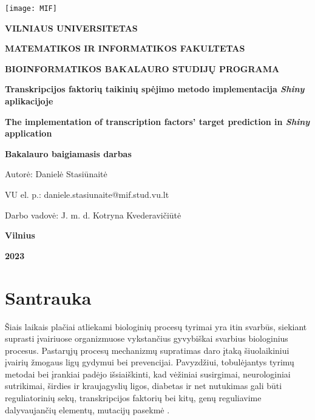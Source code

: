 \documentclass[12pt]{article}
\begin{document}

\begin{titlepage}
\vskip 20pt
\begin{center}
\texttt{[image: MIF]}
\end{center}


\vskip 20pt
\centerline{\bf \large \textbf{VILNIAUS UNIVERSITETAS}}
\bigskip
\centerline{\large \textbf{MATEMATIKOS IR INFORMATIKOS FAKULTETAS}}
\bigskip
\centerline{\large \textbf{BIOINFORMATIKOS BAKALAURO STUDIJŲ PROGRAMA}}



\vskip 90pt
\begin{center}
    {\bf \LARGE Transkripcijos faktorių taikinių spėjimo metodo implementacija
    \emph{Shiny} aplikacijoje}
\end{center}
\begin{center}
    {\bf \Large The implementation of transcription factors' target prediction
    in \emph{Shiny} application}
\end{center}
\vskip 20pt
\centerline{\bf \large \textbf{Bakalauro baigiamasis darbas}}
\bigskip
\vskip 40pt

\hskip 140pt {\large Autorė: Danielė Stasiūnaitė}

\hskip 140pt{\large VU el. p.: daniele.stasiunaite@mif.stud.vu.lt}
\bigskip
\vskip 20pt

\hskip 140pt {\large Darbo vadovė: J. m. d. Kotryna Kvederavičiūtė}
\vskip 60pt
\vskip 40pt
\centerline{\large \textbf{Vilnius}}
\centerline{\large \textbf{2023}}
\newpage
\end{titlepage}



\tableofcontents
\newpage


\section*{Santrauka}
Šiais laikais plačiai atliekami biologinių procesų tyrimai yra itin svarbūs,
siekiant suprasti įvairiuose organizmuose vykstančius gyvybiškai svarbius
biologinius procesus. Pastarųjų
procesų mechanizmų supratimas daro įtaką šiuolaikiniui įvairių žmogaus ligų
gydymui bei prevencijai. Pavyzdžiui, tobulėjantys tyrimų metodai bei įrankiai
padėjo išsiaiškinti, kad vėžiniai susirgimai, neurologiniai sutrikimai, širdies
ir kraujagyslių ligos, diabetas ir net nutukimas gali būti reguliatorinių sekų, 
transkripcijos faktorių bei kitų, genų reguliavime dalyvaujančių elementų,
mutacijų pasekmė  \cite{ARTICLE0}.
\end{document}
